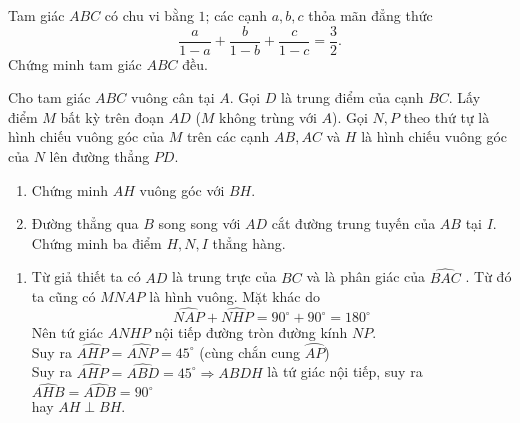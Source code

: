 \begin{ex}%
	Tam giác $ABC$ có chu vi bằng $1$; các cạnh $a, b, c$ thỏa mãn đẳng thức $$\dfrac{a}{1-a}+\dfrac{b}{1-b}+\dfrac{c}{1-c}=\dfrac{3}{2}.$$ Chứng minh tam giác $ABC$ đều.	
	
\end{ex}

\begin{ex}%
		Cho tam giác $ABC$ vuông cân tại $A$. Gọi $D$ là trung điểm của cạnh $BC$. Lấy điểm $M$ bất kỳ trên đoạn $AD$ ($M$ không trùng với $A$). Gọi $N, P$ theo thứ tự là hình chiếu vuông góc của $M$ trên các cạnh $AB, AC$ và $H$ là hình chiếu vuông góc của $N$ lên đường thẳng $PD$.
	\begin{enumerate}
		\item Chứng minh $AH$ vuông góc với $BH.$
		\item Đường thẳng qua $B$ song song với $AD$ cắt đường trung tuyến của $AB$ tại $I$. Chứng minh ba điểm $H, N, I$ thẳng hàng.
	\end{enumerate}
	\loigiai
	{
	\begin{enumerate}
		\item 
			\immini
		{
		Từ giả thiết ta có $AD$ là trung trực của $BC$ và là phân giác của $\widehat {BAC}$ . Từ đó ta cũng có $MNAP$ là hình vuông. Mặt khác do $$ \widehat{NAP}+\widehat {NHP}=90^\circ+90^\circ=180^\circ $$ Nên tứ giác $ANHP$ nội tiếp đường tròn đường kính $NP$. \\
		Suy ra $\widehat{AHP}=\widehat {ANP}=45^\circ$ (cùng chắn cung $\wideparen{AP}$)\\
		Suy ra $\widehat{AHP}=\widehat {ABD}=45^\circ \Rightarrow ABDH$ là tứ giác nội tiếp, suy ra $\widehat{AHB}=\widehat {ADB}=90^\circ$ \\  hay $AH \perp BH.$
			
		}{
			}
\end{enumerate}}
\end{ex}
